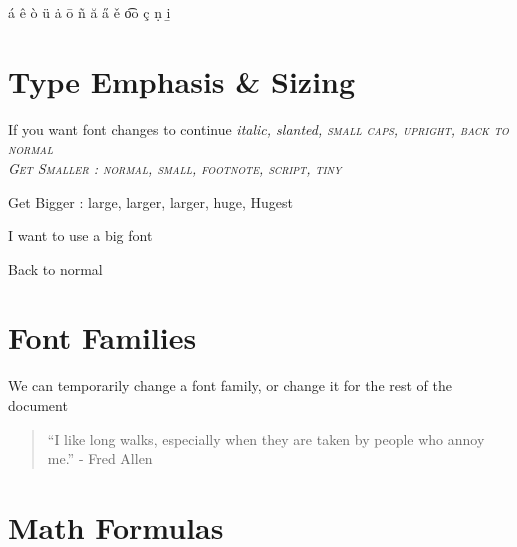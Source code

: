 \documentclass[a4paper,12pt]{book}
\begin{document}
\'{a} \^{e} \`{o} \"{u} \.{a} \={o} \~{n} \u{a} \H{a} \v{e} \t{oo} \c{c} \d{n} \b{i}



\section[Type]{\textsf{Type Emphasis \& Sizing}} \label{sec:typeemp}

If you want font changes to continue \itshape italic, \slshape slanted, \scshape small caps, \upshape upright, \normalfont back to normal\\

Get Smaller : \normalsize{normal}, \small{small}, \footnotesize{footnote}, \scriptsize{script}, \tiny{tiny}

Get Bigger : \large{large}, \Large{larger}, \LARGE{larger}, \huge{huge}, \Huge{Hugest}

\begin{LARGE}
I want to use a big font
\end{LARGE}

\normalsize{Back to normal}

\section{\textsf{Font Families}}
We can {\sffamily temporarily change} a font family, \ttfamily or change it for the rest of the document \sffamily

\begin{quote}
``I like long walks, especially when they are taken by people who annoy me.'' 
- Fred Allen
\end{quote} 

\section{Math Formulas}
\end{document}
